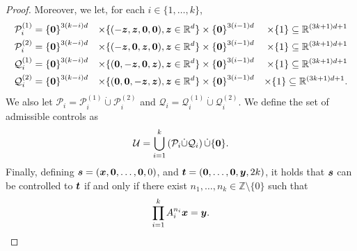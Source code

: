 \begin{proof}
Moreover, we let, for each $i \in \lbrace 1, \ldots, k \rbrace$,
\begin{align*}
\mathcal{P}_{i}^{(1)} &= {\lbrace \boldsymbol{0} \rbrace}^{3(k-i)d} &\times
\lbrace (-\boldsymbol{z}, \boldsymbol{z}, \boldsymbol{0}, \boldsymbol{0}), \boldsymbol{z} \in \mathbb{R}^{d} \rbrace &\times
{\lbrace \boldsymbol{0} \rbrace}^{3(i-1)d} &\times \lbrace 1 \rbrace
\subseteq \mathbb{R}^{(3k+1)d+1} \\
\mathcal{P}_{i}^{(2)} &= {\lbrace \boldsymbol{0} \rbrace}^{3(k-i)d} &\times
\lbrace (-\boldsymbol{z}, \boldsymbol{0}, \boldsymbol{z}, \boldsymbol{0}), \boldsymbol{z} \in \mathbb{R}^{d} \rbrace &\times
{\lbrace \boldsymbol{0} \rbrace}^{3(i-1)d} &\times \lbrace 1 \rbrace
\subseteq \mathbb{R}^{(3k+1)d+1} \\
\mathcal{Q}_{i}^{(1)} &= {\lbrace \boldsymbol{0} \rbrace}^{3(k-i)d} &\times
\lbrace (\boldsymbol{0}, -\boldsymbol{z}, \boldsymbol{0}, \boldsymbol{z}), \boldsymbol{z} \in \mathbb{R}^{d} \rbrace &\times
{\lbrace \boldsymbol{0} \rbrace}^{3(i-1)d} &\times \lbrace 1 \rbrace
\subseteq \mathbb{R}^{(3k+1)d+1} \\
\mathcal{Q}_{i}^{(2)} &= {\lbrace \boldsymbol{0} \rbrace}^{3(k-i)d} &\times
\lbrace (\boldsymbol{0}, \boldsymbol{0}, -\boldsymbol{z}, \boldsymbol{z}), \boldsymbol{z} \in \mathbb{R}^{d} \rbrace &\times
{\lbrace \boldsymbol{0} \rbrace}^{3(i-1)d} &\times \lbrace 1 \rbrace
\subseteq \mathbb{R}^{(3k+1)d+1}.
\end{align*}
We also let $\mathcal{P}_{i} = \mathcal{P}_{i}^{(1)} \dot{\cup} \mathcal{P}_{i}^{(2)}$ and $\mathcal{Q}_{i} = \mathcal{Q}_{i}^{(1)} \dot{\cup} \mathcal{Q}_{i}^{(2)}$.
We define the set of admissible controls as
\begin{align*}
\mathcal{U} = \bigcup\limits_{i=1}^{k} \left( \mathcal{P}_{i} \dot{\cup} \mathcal{Q}_{i} \right) \dot{\cup} \lbrace \boldsymbol{0} \rbrace.
\end{align*}
Finally, defining $\boldsymbol{s} = (\boldsymbol{x}, \boldsymbol{0}, \ldots, \boldsymbol{0}, 0)$, and $\boldsymbol{t} = (\boldsymbol{0}, \ldots, \boldsymbol{0}, \boldsymbol{y}, 2k)$, it holds that $\boldsymbol{s}$ can be controlled to $\boldsymbol{t}$ if and only if there exist $n_{1}, \ldots, n_{k} \in \mathbb{Z} \setminus \lbrace 0 \rbrace$ such that
\begin{equation*}
\prod\limits_{i=1}^{k}A_{i}^{n_{i}} \boldsymbol{x} = \boldsymbol{y}.
\end{equation*}


\end{proof}
